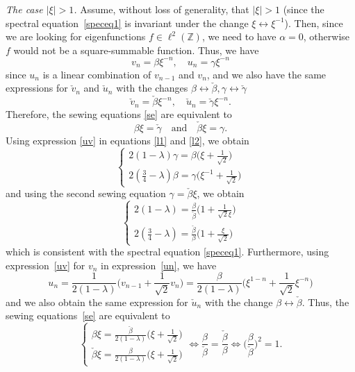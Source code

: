 \documentclass[11pt]{amsart}
\newcommand{\Z}{\mathbb{Z}}
\theoremstyle{definition}
\theoremstyle{remark}
\theoremstyle{plain}
\numberwithin{equation}{section}
\numberwithin{lemma}{section}
\numberwithin{definition}{section}
\numberwithin{proposition}{section}
\numberwithin{corollary}{section}
\numberwithin{theorem}{section}
\numberwithin{remark}{section}
\begin{document}
\vskip 0.3cm
{\it The case $\vert \xi \vert>1$.}
Assume, without loss of generality, that $\vert \xi \vert>1$ (since the spectral equation~\eqref{speceq1} is invariant under the change $\xi \leftrightarrow \xi^{-1}$). 
Then, since we are looking for eigenfunctions $f\in\ell^2(\Z)$, we need to have $\alpha=0$, 
otherwise $f$ would not be a square-summable function. Thus, we have
\begin{equation}\label{uv}
 v_n=\beta \xi^{-n}, \quad u_n=\gamma \xi^{-n}
\end{equation} 
since $u_n$ is a linear combination of $v_{n-1}$ and $v_n$, and we also have the same expressions for $\check{v}_n$ and $\check{u}_n$ with the changes $\beta \leftrightarrow \check{\beta}, \gamma \leftrightarrow \check{\gamma}$
\begin{equation}\label{ouv}
 \check{v}_n=\check{\beta} \xi^{-n}, \quad \check{u}_n=\check{\gamma} \xi^{-n}.
\end{equation} 
Therefore, the sewing equations \eqref{se} are equivalent to 
\begin{equation}\label{nse}
 \beta \xi=\check{\gamma} \quad \text{and} \quad \check{\beta} \xi=\gamma.
\end{equation}
Using expression \eqref{uv} in equations \eqref{l1} and \eqref{l2}, we obtain
$$
\begin{cases} { }
2(1-\lambda)\gamma=\beta \Big(\xi+\frac{1}{\sqrt{2}}\Big) \\
2(\frac{3}{4}-\lambda)\beta=\gamma\Big(\xi^{-1}+\frac{1}{\sqrt{2}}\Big)
\end{cases}
$$
and using the second sewing equation $\gamma= \check{\beta}\xi$, we obtain 
\begin{equation}\label{nl1l2}
 \begin{cases} { }
2(1-\lambda)=\frac{\beta}{ \check{\beta}} \Big(1+\frac{1}{\sqrt{2}\xi}\Big) \\
2(\frac{3}{4}-\lambda)=\frac{\check{\beta}}{\beta}\Big(1+\frac{\xi}{\sqrt{2}}\Big)
\end{cases}
\end{equation}
which is consistent with the spectral equation \eqref{speceq1}.
Furthermore, using expression~\eqref{uv} for $v_n$ in expression~\eqref{un}, we have 
$$
u_n=\frac{1}{2(1-\lambda)}\Big(v_{n-1}+\frac{1}{\sqrt{2}}v_n\Big)=\frac{\beta}{2(1-\lambda)}\Big(\xi^{1-n}+\frac{1}{\sqrt{2}}\xi^{-n}\Big)
$$
and we also obtain the same expression for $\check{u}_n$ with the change $\beta \leftrightarrow \check{\beta}$.
Thus, the sewing equations~\eqref{se} are equivalent to 
$$
\begin{cases} { }
\beta \xi=\frac{\check{\beta}}{2(1-\lambda)}\Big(\xi+\frac{1}{\sqrt{2}}\Big) \\
\check{\beta} \xi=\frac{\beta}{2(1-\lambda)}\Big(\xi+\frac{1}{\sqrt{2}}\Big)
\end{cases}
\iff 
\frac{\beta}{ \check{\beta}}=\frac{\check{\beta}}{\beta}
\iff
\Big(\frac{\beta}{ \check{\beta}}\Big)^2=1.
$$
\end{document}
